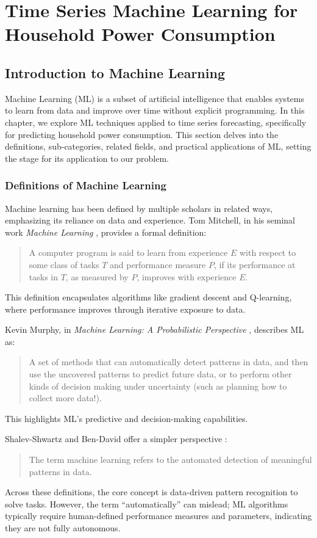 \chapter{Time Series Machine Learning for Household Power Consumption}

	\section{Introduction to Machine Learning}
	Machine Learning (ML) is a subset of artificial intelligence that enables systems to learn from data and improve over time without explicit programming. In this chapter, we explore ML techniques applied to time series forecasting, specifically for predicting household power consumption. This section delves into the definitions, sub-categories, related fields, and practical applications of ML, setting the stage for its application to our problem.
	
	\subsection{Definitions of Machine Learning}
	Machine learning has been defined by multiple scholars in related ways, emphasizing its reliance on data and experience. Tom Mitchell, in his seminal work \textit{Machine Learning} \cite{mitchell1997machine}, provides a formal definition:
	\begin{quote}
		A computer program is said to learn from experience $E$ with respect to some class of tasks $T$ and performance measure $P$, if its performance at tasks in $T$, as measured by $P$, improves with experience $E$.
	\end{quote}
	This definition encapsulates algorithms like gradient descent and Q-learning, where performance improves through iterative exposure to data.
	
	Kevin Murphy, in \textit{Machine Learning: A Probabilistic Perspective} \cite{murphy2012machine}, describes ML as:
	\begin{quote}
		A set of methods that can automatically detect patterns in data, and then use the uncovered patterns to predict future data, or to perform other kinds of decision making under uncertainty (such as planning how to collect more data!).
	\end{quote}
	This highlights ML's predictive and decision-making capabilities.
	
	Shalev-Shwartz and Ben-David offer a simpler perspective \cite{shalev2014understanding}:
	\begin{quote}
		The term machine learning refers to the automated detection of meaningful patterns in data.
	\end{quote}
	Across these definitions, the core concept is data-driven pattern recognition to solve tasks. However, the term ``automatically'' can mislead; ML algorithms typically require human-defined performance measures and parameters, indicating they are not fully autonomous.
	
